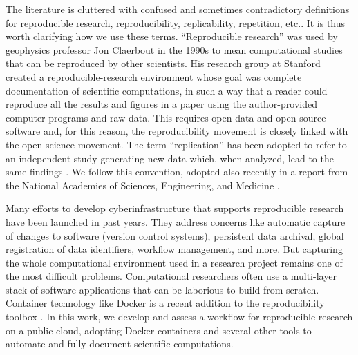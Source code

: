 \documentclass[10pt,journal,compsoc]{IEEEtran}
\begin{document}
The literature is cluttered with confused and sometimes contradictory definitions for reproducible research, reproducibility, replicability, repetition, etc.\cite{barba_2018}.
It is thus worth clarifying how we use these terms.
``Reproducible research'' was used by geophysics professor Jon Claerbout in the 1990s to mean computational studies that can be reproduced by other scientists. His research group at Stanford created a reproducible-research environment\cite{schwab_et_al_2000} whose goal was complete documentation of scientific computations, in such a way that a reader could reproduce all the results and figures in a paper using the author-provided computer programs and raw data.
This requires open data and open source software and, for this reason, the reproducibility movement is closely linked with the open science movement.
The term ``replication'' has been adopted to refer to an independent study generating new data which, when analyzed, lead to the same findings \cite{peng_2011}.
We follow this convention, adopted also recently in a report from the National Academies of Sciences, Engineering, and Medicine \cite{nasa_oss_2018}.

Many efforts to develop cyberinfrastructure that supports reproducible research have been launched in past years. 
They address concerns like automatic capture of changes to software (version control systems), persistent data archival, global registration of data identifiers, workflow management, and more. 
But capturing the whole computational environment used in a research project remains one of the most difficult problems. 
Computational researchers often use a multi-layer stack of software applications that can be laborious to build from scratch. 
Container technology like Docker is a recent addition to the reproducibility toolbox \cite{boettiger_2015}. 
In this work, we develop and assess a workflow for reproducible research on a public cloud, adopting Docker containers and several other tools to automate and fully document scientific computations.
\end{document}

